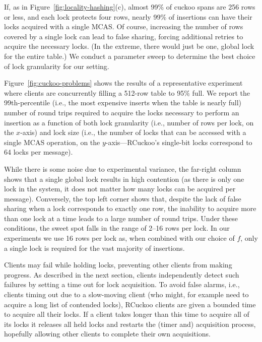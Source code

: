 If, as in Figure~\ref{fig:locality-hashing}(c), almost 99\% of cuckoo
spans are 256 rows or less, and each lock protects four rows, nearly
99\% of insertions can have their locks acquired with a single MCAS.
Of course, increasing the number of rows covered by a single lock can
lead to false sharing, forcing additional retries to acquire the
necessary locks.  (In the extreme, there would just be one, global
lock for the entire table.)  We conduct a parameter sweep to determine
the best choice of lock granularity for our setting.

Figure~\ref{fig:cuckoo-problems} shows the results of a representative
experiment where  clients are concurrently filling a 512-row
table to 95\% full.  We report the 99th-percentile (i.e., the most
expensive inserts when the table is nearly full) number of
round trips required to acquire the locks necessary to perform an
insertion as a function of both lock granularity (i.e., number of rows
per lock, on the $x$-axis) and lock size (i.e., the number of locks
that can be accessed with a single MCAS operation, on the
$y$-axis---RCuckoo's single-bit locks correspond to 64 locks per
message).

While there is some noise due to experimental variance, the far-right
column shows that a single global lock results in high contention (as
there is only one lock in the system, it does not matter how many
locks can be acquired per message).  Conversely, the top left corner shows
that, despite the lack of false sharing when a lock corresponds to
exactly one row, the inability to acquire more than one lock at a time
leads to a large number of round trips.  Under these conditions, the
sweet spot falls in the range of 2--16 rows per lock.  In our
experiments we use 16 rows per lock as, when combined with our choice of
$f$, only a single lock is required for the vast majority of insertions.

%
Clients may fail while holding locks, preventing other clients from
making progress.  As described in the next section, clients
independently detect such failures by setting a time out for lock
acquisition. To avoid false alarms, i.e., clients timing out due to a
slow-moving client (who might, for example need to acquire a long list
of contended locks), RCuckoo clients are given a bounded time to
acquire all their locks. If a client takes longer than this time to
acquire all of its locks it releases all held locks and restarts the
(timer and) acquisition process, hopefully allowing other clients to
complete their own acquisitions.


